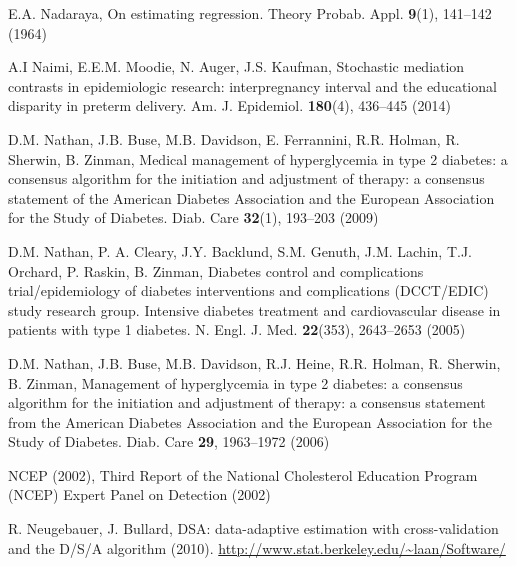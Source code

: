 \begin{list}{}{\setlength{\leftmargin}{2.1em}\setlength{\labelwidth}{0pt}
  \setlength{\labelsep}{0pt}\setlength{\itemindent}{-2.1em}
  \setlength{\parsep}{0pt}\setlength{\itemsep}{2pt}\setlength{\topsep}{0pt}}
\item\label{refentry:REF238}E.A. Nadaraya, On estimating regression. Theory Probab. Appl. \textbf{9}(1), 141--142 (1964)\label{refend:REF238}
\item\label{refentry:REF239}A.I Naimi, E.E.M. Moodie, N. Auger, J.S. Kaufman, Stochastic mediation contrasts in epidemiologic research: interpregnancy interval and the educational disparity in preterm delivery. Am. J. Epidemiol. \textbf{180}(4), 436--445 (2014)\label{refend:REF239}
\item\label{refentry:REF240}D.M. Nathan, J.B. Buse, M.B. Davidson, E. Ferrannini, R.R. Holman, R. Sherwin, B. Zinman, Medical management of hyperglycemia in type 2 diabetes: a consensus algorithm for the initiation and adjustment of therapy: a consensus statement of the American Diabetes Association and the European Association for the Study of Diabetes. Diab. Care \textbf{32}(1), 193--203 (2009)\label{refend:REF240}
\item\label{refentry:REF241}D.M. Nathan, P. A. Cleary, J.Y. Backlund, S.M. Genuth, J.M. Lachin, T.J. Orchard, P. Raskin, B. Zinman, Diabetes control and complications trial/epidemiology of diabetes interventions and complications (DCCT/EDIC) study research group. Intensive diabetes treatment and cardiovascular disease in patients with type 1 diabetes. N. Engl. J. Med. \textbf{22}(353), 2643--2653 (2005)\label{refend:REF241}
\item\label{refentry:REF242}D.M. Nathan, J.B. Buse, M.B. Davidson, R.J. Heine, R.R. Holman, R. Sherwin, B. Zinman, Management of hyperglycemia in type 2 diabetes: a consensus algorithm for the initiation and adjustment of therapy: a consensus statement from the American Diabetes Association and the European Association for the Study of Diabetes. Diab. Care \textbf{29}, 1963--1972 (2006)\label{refend:REF242}
\item\label{refentry:REF243}NCEP (2002), Third Report of the National Cholesterol Education Program (NCEP) Expert Panel on Detection (2002)\label{refend:REF243}
\item\label{refentry:REF244}R. Neugebauer, J. Bullard, DSA: data-adaptive estimation with cross-validation and the D/S/A algorithm (2010). \url{http://www.stat.berkeley.edu/~laan/Software/}\label{refend:REF244}

\end{list}
